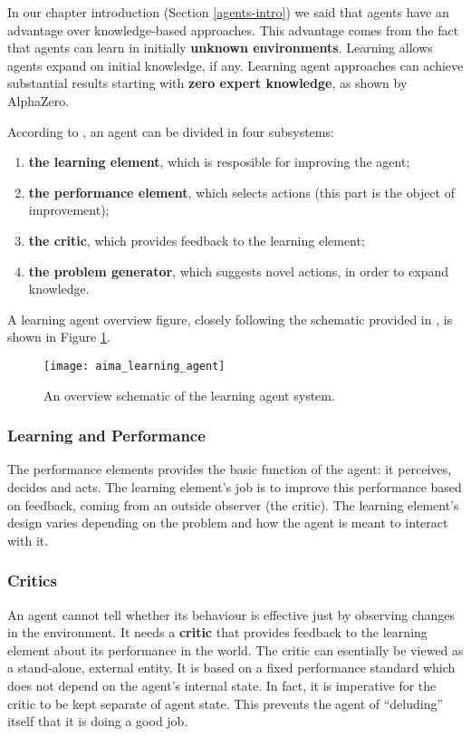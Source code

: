 In our chapter introduction (Section \ref{agents-intro}) we said that agents have an advantage over knowledge-based approaches.
This advantage comes from the fact that agents can learn in initially \textbf{unknown environments}.
Learning allows agents expand on initial knowledge, if any.
Learning agent approaches can achieve substantial results starting with \textbf{zero expert knowledge}, as shown by AlphaZero\cite{alpha-zero}.

According to \cite{aima}, an agent can be divided in four subsystems:
\begin{enumerate}
    \item \textbf{the learning element}, which is resposible for improving the agent;
    \item \textbf{the performance element}, which selects actions (this part is the object of improvement);
    \item \textbf{the critic}, which provides feedback to the learning element;
    \item \textbf{the problem generator}, which suggests novel actions, in order to expand knowledge.    
\end{enumerate}

A learning agent overview figure, closely following the schematic provided in \cite{aima}, is shown in Figure \ref{fig:aima-learning-agent}.

\begin{figure}[ht]
    \texttt{[image: aima\_learning\_agent]}
    \centering
    \caption{An overview schematic of the learning agent system.}
    \label{fig:aima-learning-agent}
\end{figure}

\subsubsection{Learning and Performance}
The performance elements provides the basic function of the agent: it perceives, decides and acts.
The learning element's job is to improve this performance based on feedback, coming from an outside observer (the critic).
The learning element's design varies depending on the problem and how the agent is meant to interact with it.

\subsubsection{Critics}
An agent cannot tell whether its behaviour is effective just by observing changes in the environment.
It needs a \textbf{critic} that provides feedback to the learning element about its performance in the world.
The critic can esentially be viewed as a stand-alone, external entity.
It is based on a fixed performance standard which does not depend on the agent's internal state.
In fact, it is imperative for the critic to be kept separate of agent state.
This prevents the agent of ``deluding'' itself that it is doing a good job.

